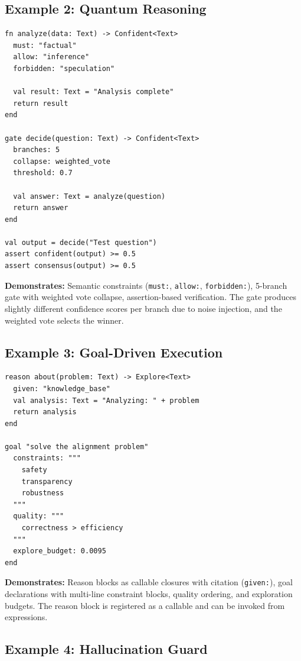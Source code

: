 \documentclass[11pt,a4paper]{article}
\begin{document}
\subsection{Example 2: Quantum Reasoning}

\begin{lstlisting}[caption={Function with constraints and consensus gate.}]
fn analyze(data: Text) -> Confident<Text>
  must: "factual"
  allow: "inference"
  forbidden: "speculation"

  val result: Text = "Analysis complete"
  return result
end

gate decide(question: Text) -> Confident<Text>
  branches: 5
  collapse: weighted_vote
  threshold: 0.7

  val answer: Text = analyze(question)
  return answer
end

val output = decide("Test question")
assert confident(output) >= 0.5
assert consensus(output) >= 0.5
\end{lstlisting}

\textbf{Demonstrates:} Semantic constraints (\texttt{must:}, \texttt{allow:},
\texttt{forbidden:}), 5-branch gate with weighted vote collapse, assertion-based
verification. The gate produces slightly different confidence scores per branch
due to noise injection, and the weighted vote selects the winner.

\subsection{Example 3: Goal-Driven Execution}

\begin{lstlisting}[caption={Reason block with goal declaration.}]
reason about(problem: Text) -> Explore<Text>
  given: "knowledge_base"
  val analysis: Text = "Analyzing: " + problem
  return analysis
end

goal "solve the alignment problem"
  constraints: """
    safety
    transparency
    robustness
  """
  quality: """
    correctness > efficiency
  """
  explore_budget: 0.0095
end
\end{lstlisting}

\textbf{Demonstrates:} Reason blocks as callable closures with citation
(\texttt{given:}), goal declarations with multi-line constraint blocks, quality
ordering, and exploration budgets. The reason block is registered as a callable
and can be invoked from expressions.

\subsection{Example 4: Hallucination Guard}
\end{document}
